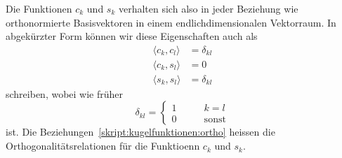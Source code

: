 Die Funktionen $c_k$ und $s_k$ verhalten sich also in jeder Beziehung
wie orthonormierte Basisvektoren in einem endlichdimensionalen Vektorraum.
In abgekürzter Form können wir diese Eigenschaften auch als
\begin{equation}
\begin{aligned}
\langle c_k,c_l\rangle
&=
\delta_{kl}
\\
\langle c_k,s_l\rangle
&=0
\\
\langle s_k,s_l\rangle
&=
\delta_{kl}
\end{aligned}
\label{skript:kugelfunktionen:ortho}
\end{equation}
schreiben, wobei wie früher
\[
\delta_{kl}=\begin{cases}
1&\qquad k=l\\
0&\qquad\text{sonst}
\end{cases}
\]
ist.
Die Beziehungen~\eqref{skript:kugelfunktionen:ortho} heissen die
Orthogonalitätsrelationen für die Funktioenn $c_k$ und $s_k$.


